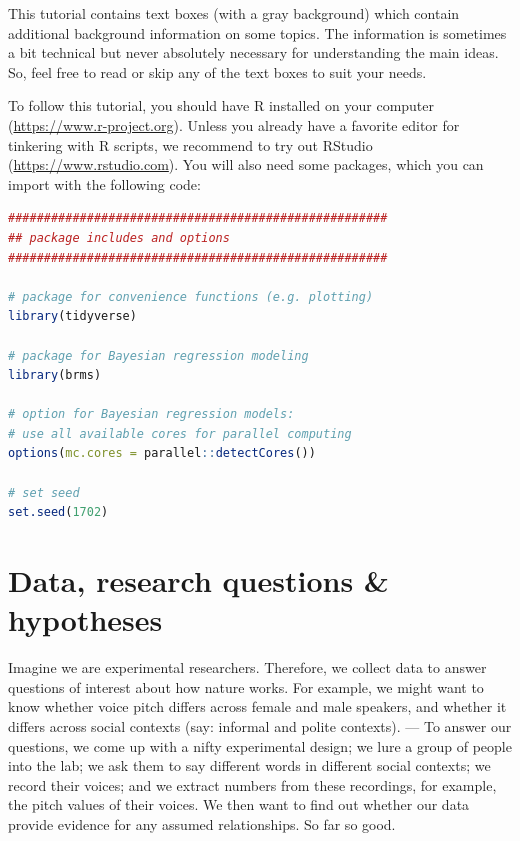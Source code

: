 \documentclass[nobib]{tufte-handout}
\begin{document}
This tutorial contains text boxes (with a gray background) which contain additional background information on some topics.
The information is sometimes a bit technical but never absolutely necessary for understanding the main ideas.
So, feel free to read or skip any of the text boxes to suit your needs.

To follow this tutorial, you should have R installed on your computer (\url{https://www.r-project.org}).
Unless you already have a favorite editor for tinkering with R scripts, we recommend to try out RStudio (\url{https://www.rstudio.com}).
You will also need some packages,
which you can import with the following code:

\begin{minipage}[]{\textwidth}
\begin{lstlisting}[language=R]
#####################################################
## package includes and options
#####################################################

# package for convenience functions (e.g. plotting)
library(tidyverse)

# package for Bayesian regression modeling
library(brms)

# option for Bayesian regression models: 
# use all available cores for parallel computing
options(mc.cores = parallel::detectCores())

# set seed
set.seed(1702)
\end{lstlisting}
\end{minipage}

\section{Data, research questions \& hypotheses}
\label{sec:data}

Imagine we are experimental researchers. Therefore, we collect data to answer questions of
interest about how nature works. For example, we might want to know whether voice pitch differs across female and male speakers, and whether it differs across social contexts (say: informal and polite contexts). --- To answer our questions, we come up with a nifty experimental design; we lure a group of people into the lab; we ask them to say different words in different social contexts; we record their voices; and we extract numbers from these recordings, for example, the pitch values of their voices. We then want to find out whether our data provide evidence for any assumed relationships. So far so good. 
\end{document}
